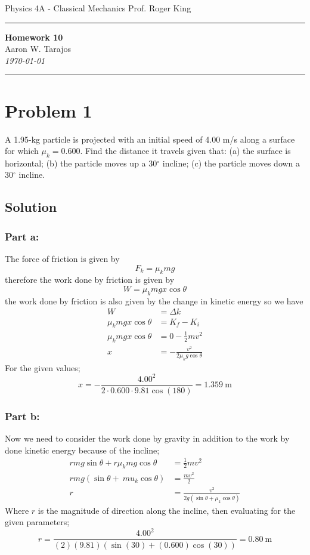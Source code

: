 \documentclass{article}
\begin{document}
\noindent
Physics 4A - Classical Mechanics \hfill Prof. Roger King

\noindent\rule{\textwidth}{0.4pt}

\begin{center}
    \textbf{\LARGE Homework 10} \\
    \vspace{12pt}
    \large Aaron W. Tarajos \\
    \textit{\today}
\end{center}

\noindent\rule{\textwidth}{0.4pt}

\section*{Problem 1}
A 1.95-kg particle is projected with an initial speed of 4.00 m/s along a surface for which $\mu_k = 0.600$.
Find the distance it travels given that: (a) the surface is horizontal; (b) the particle moves up a 30$^\circ$ incline;
(c) the particle moves down a 30$^\circ$ incline.

\subsection*{Solution}
\subsubsection*{Part a:}
The force of friction is given by
\[
	F_k = \mu_k mg
\]
therefore the work done by friction is given by
\[
	W = \mu_k mg x \cos \theta
\]
the work done by friction is also given by the change in kinetic energy so we have
\begin{align*}
	W &= \Delta k \\
	\mu_k mg x \cos \theta &= K_f - K_i \\
	\mu_k mg x \cos \theta &= 0 - \frac{1}{2}mv^2 \\
	x &= - \frac{v^2}{2 \mu_k g \cos \theta}
\end{align*}
For the given values;
\[
	x = - \frac{4.00^2}{2 \cdot 0.600 \cdot 9.81 \cos(180)} = \boxed{1.359\ \text{m}}
\]

\subsubsection*{Part b:}
Now we need to consider the work done by gravity in addition to the work by done kinetic energy because of the incline;
\begin{align*}
	r mg \sin \theta + r \mu_k mg \cos \theta &= \frac{1}{2}mv^2 \\
	rmg\left(\sin\theta + \ mu_k\cos\theta \right) &= \frac{mv^2}{2} \\
	r &= \frac{v^2}{2g\left(\sin\theta + \mu_k\cos\theta\right)}
\end{align*}
Where $r$ is the magnitude of direction along the incline, then evaluating for the given parameters;
\[
	r = \frac{4.00^2}{(2)(9.81)\left(\sin(30) + (0.600)\cos(30)\right)} = \boxed{0.80\ \text{m}}
\]
\end{document}
